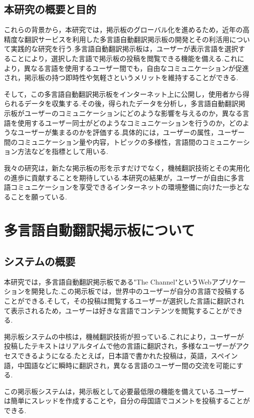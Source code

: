 \documentclass[b5paper,12pt,dvipdfmx]{jsreport}
\begin{document}
\section{本研究の概要と目的}

これらの背景から，本研究では，掲示板のグローバル化を進めるため，近年の高精度な翻訳サービスを利用した多言語自動翻訳掲示板の開発とその利活用について実践的な研究を行う.多言語自動翻訳掲示板は，ユーザーが表示言語を選択することにより，選択した言語で掲示板の投稿を閲覧できる機能を備える.これにより，異なる言語を使用するユーザー間でも，自由なコミュニケーションが促進され，掲示板の持つ即時性や気軽さというメリットを維持することができる.

そして，この多言語自動翻訳掲示板をインターネット上に公開し，使用者から得られるデータを収集する.その後，得られたデータを分析し，多言語自動翻訳掲示板がユーザーのコミュニケーションにどのような影響を与えるのか，異なる言語を使用するユーザー同士がどのようなコミュニケーションを行うのか，どのようなユーザーが集まるのかを評価する.具体的には，ユーザーの属性，ユーザー間のコミュニケーション量や内容，トピックの多様性，言語間のコミュニケーション方法などを指標として用いる.

我々の研究は，新たな掲示板の形を示すだけでなく，機械翻訳技術とその実用化の進歩に貢献することを期待している.本研究の結果が，ユーザーが自由に多言語コミュニケーションを享受できるインターネットの環境整備に向けた一歩となることを願っている.


\chapter{多言語自動翻訳掲示板について}
\section{システムの概要}

本研究では，多言語自動翻訳掲示板である"The Channel"というWebアプリケーションを開発した.この掲示板では，世界中のユーザーが自分の言語で投稿することができる.そして，その投稿は閲覧するユーザーが選択した言語に翻訳されて表示されるため，ユーザーは好きな言語でコンテンツを閲覧することができる.

掲示板システムの中核は，機械翻訳技術が担っている.これにより，ユーザーが投稿したテキストはリアルタイムで他の言語に翻訳され，多様なユーザーがアクセスできるようになる.たとえば，日本語で書かれた投稿は，英語，スペイン語，中国語などに瞬時に翻訳され，異なる言語のユーザー間の交流を可能にする.

この掲示板システムは，掲示板として必要最低限の機能を備えている.ユーザーは簡単にスレッドを作成することや，自分の母国語でコメントを投稿することができる.
\end{document}
